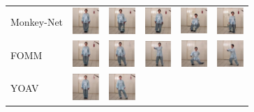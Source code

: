 \documentclass{article}
\begin{document}
\begin{tabular}{m{1.5cm}m{1.5cm}m{1.5cm}}
Monkey-Net & \includegraphics[width=1cm, height=1cm]{paper/images/2_Monkey-Net_1.JPG} & \includegraphics[width=1cm, height=1cm]{paper/images/2_Monkey-Net_2.JPG} &
\includegraphics[width=1cm, height=1cm]{paper/images/2_Monkey-Net_3.JPG}&
\includegraphics[width=1cm, height=1cm]{paper/images/2_Monkey-Net_4.JPG}&
\includegraphics[width=1cm, height=1cm]{paper/images/2_Monkey-Net_5.JPG}\\
FOMM & \includegraphics[width=1cm, height=1cm]{paper/images/3_FOMM_1.JPG} & \includegraphics[width=1cm, height=1cm]{paper/images/3_FOMM_2.JPG} &
\includegraphics[width=1cm, height=1cm]{paper/images/3_FOMM_3.JPG}&
\includegraphics[width=1cm, height=1cm]{paper/images/3_FOMM_4.JPG}&
\includegraphics[width=1cm, height=1cm]{paper/images/3_FOMM_5.JPG}\\
YOAV & \includegraphics[width=1cm, height=1cm]{paper/images/4_YOAV_1.JPG} & \includegraphics[width=1cm, height=1cm]{paper/images/4_YOAV_2.JPG} &

\end{tabular}
\end{document}
